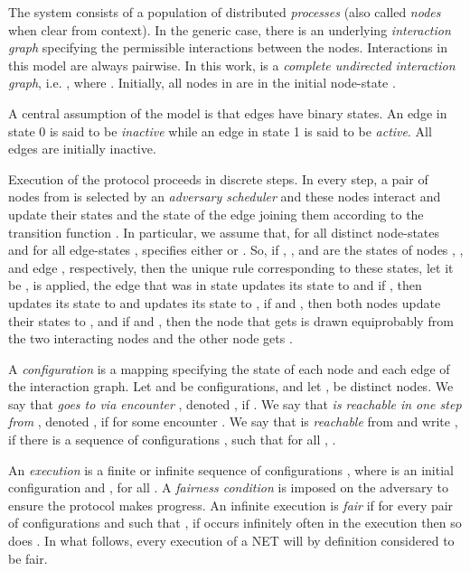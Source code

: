 \documentclass[oribibl, 11pt]{llncs}
\begin{document}
The system consists of a population  of  distributed \emph{processes} (also called \emph{nodes} when clear from context). In the generic case, there is an underlying \emph{interaction graph}  specifying the permissible interactions between the nodes. Interactions in this model are always pairwise. In this work,  is a \emph{complete undirected interaction graph}, i.e. , where . Initially, all nodes in  are in the initial node-state . 

A central assumption of the model is that edges have binary states. An edge in state 0 is said to be \emph{inactive} while an edge in state 1 is said to be \emph{active}. All edges are initially inactive.

Execution of the protocol proceeds in discrete steps. In every step, a pair of nodes  from  is selected by an \emph{adversary scheduler} and these nodes interact and update their states and the state of the edge joining them according to the transition function . In particular, we assume that, for all distinct node-states  and for all edge-states ,  specifies either  or . So, if , , and  are the states of nodes , , and edge , respectively, then the unique rule corresponding to these states, let it be , is applied, the edge that was in state  updates its state to  and if , then  updates its state to  and  updates its state to , if  and , then both nodes update their states to , and if  and , then the node that gets  is drawn equiprobably from the two interacting nodes and the other node gets . 

A \emph{configuration} is a mapping  specifying the state of each node and each edge of the interaction graph. Let  and  be configurations, and let ,  be distinct nodes. We say that \emph{ goes to  via encounter }, denoted , if      . We say that \emph{ is reachable in one step from }, denoted , if  for some encounter . We say that  is \emph{reachable} from  and write , if there is a sequence of configurations , such that  for all , .

An \emph{execution} is a finite or infinite sequence of configurations  , where  is an initial configuration and , for all . A \emph{fairness condition} is imposed on the adversary to ensure the protocol makes progress. An infinite execution is \emph{fair} if for every pair of configurations  and  such that , if  occurs infinitely often in the execution then so does . In what follows, every execution of a NET will by definition considered to be fair.
\end{document}
